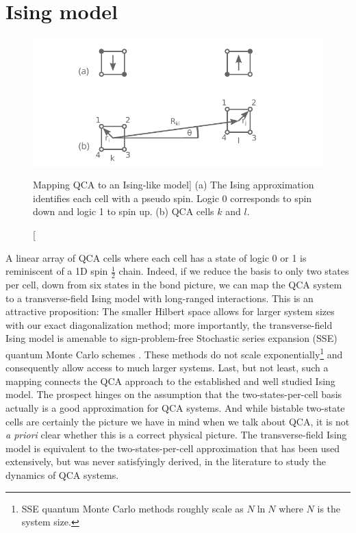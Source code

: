 \section{Ising model}

%
\begin{figure}
  \center
  \includegraphics{ising}
  \caption
  [Mapping QCA to an Ising-like model]
  {
  (a) The Ising approximation identifies each cell with a pseudo spin. Logic 0
  corresponds to spin down and logic 1 to spin up. (b) QCA cells $k$ and $l$. 
  }
  \label{fig:ising}
\end{figure}
%
A linear array of QCA cells where each cell has a state of logic 0 or 1 is
reminiscent of a 1D spin $\frac{1}{2}$ chain. Indeed, if we reduce the basis to
only two states per cell, down from six states in the bond picture, we can map
the QCA system to a transverse-field Ising model with long-ranged interactions.
This is an attractive proposition: The smaller Hilbert space allows for larger
system sizes with our exact diagonalization method; more importantly, the
transverse-field Ising model is amenable to sign-problem-free Stochastic series
expansion (SSE) quantum Monte Carlo schemes \cite{Sandvik2003}. These methods do
not scale exponentially\footnote{SSE quantum Monte Carlo methods roughly scale
as $N \ln N$ where $N$ is the system size.} and consequently allow access to
much larger systems. Last, but not least, such a mapping connects the QCA
approach to the established and well studied Ising model. The prospect hinges on
the assumption that the two-states-per-cell basis actually is a good
approximation for QCA systems. And while bistable two-state cells are certainly
the picture we have in mind when we talk about QCA, it is not \emph{a priori}
clear whether this is a correct physical picture. The transverse-field Ising
model is equivalent to the two-states-per-cell approximation that has been used
extensively, but was never satisfyingly derived, in the literature to study the
dynamics of QCA systems.

